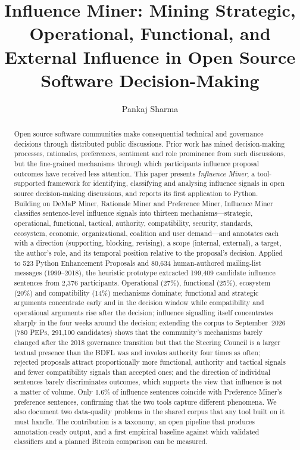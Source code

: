 \documentclass[sigconf,screen]{acmart}
\begin{document}
\title[Influence Miner]{Influence Miner: Mining Strategic, Operational, Functional, and External Influence in Open Source Software Decision-Making}

\author{Pankaj Sharma}

\renewcommand{\shortauthors}{Sharma}

\begin{abstract}
Open source software communities make consequential technical and governance decisions through distributed public discussions. Prior work has mined decision-making processes, rationales, preferences, sentiment and role prominence from such discussions, but the fine-grained mechanisms through which participants influence proposal outcomes have received less attention. This paper presents \emph{Influence Miner}, a tool-supported framework for identifying, classifying and analysing influence signals in open source decision-making discussions, and reports its first application to Python. Building on DeMaP Miner, Rationale Miner and Preference Miner, Influence Miner classifies sentence-level influence signals into thirteen mechanisms---strategic, operational, functional, tactical, authority, compatibility, security, standards, ecosystem, economic, organizational, coalition and user demand---and annotates each with a direction (supporting, blocking, revising), a scope (internal, external), a target, the author's role, and its temporal position relative to the proposal's decision. Applied to 523 Python Enhancement Proposals and 80,634 human-authored mailing-list messages (1999--2018), the heuristic prototype extracted 199,409 candidate influence sentences from 2,376 participants. Operational (27\%), functional (25\%), ecosystem (20\%) and compatibility (14\%) mechanisms dominate; functional and strategic arguments concentrate early and in the decision window while compatibility and operational arguments rise after the decision; influence signalling itself concentrates sharply in the four weeks around the decision; extending the corpus to September~2026 (780 PEPs, 291,100 candidates) shows that the community's mechanisms barely changed after the 2018 governance transition but that the Steering Council is a larger textual presence than the BDFL was and invokes authority four times as often; rejected proposals attract proportionally more functional, authority and tactical signals and fewer compatibility signals than accepted ones; and the direction of individual sentences barely discriminates outcomes, which supports the view that influence is not a matter of volume. Only 1.6\% of influence sentences coincide with Preference Miner's preference sentences, confirming that the two tools capture different phenomena. We also document two data-quality problems in the shared corpus that any tool built on it must handle. The contribution is a taxonomy, an open pipeline that produces annotation-ready output, and a first empirical baseline against which validated classifiers and a planned Bitcoin comparison can be measured.
\end{abstract}
\end{document}

